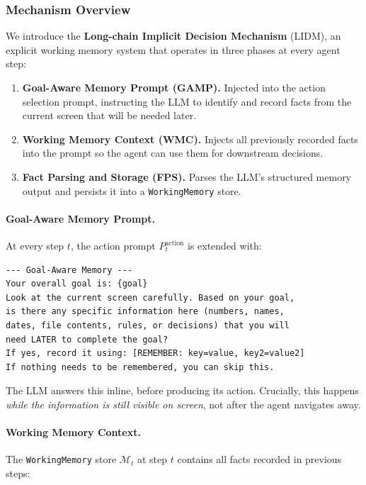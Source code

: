 \subsubsection{Mechanism Overview}

We introduce the \textbf{Long-chain Implicit Decision Mechanism} (LIDM),
an explicit working memory system that operates in three phases at every
agent step:

\begin{enumerate}[leftmargin=*,noitemsep,topsep=2pt]
    \item \textbf{Goal-Aware Memory Prompt (GAMP).} Injected into the action
    selection prompt, instructing the LLM to identify and record facts from the
    current screen that will be needed later.
    \item \textbf{Working Memory Context (WMC).} Injects all previously recorded
    facts into the prompt so the agent can use them for downstream decisions.
    \item \textbf{Fact Parsing and Storage (FPS).} Parses the LLM's structured
    memory output and persists it into a \texttt{WorkingMemory} store.
\end{enumerate}

\paragraph{Goal-Aware Memory Prompt.}
At every step $t$, the action prompt $P_t^{\text{action}}$ is extended with:

\begin{lstlisting}[basicstyle=\small\ttfamily, breaklines=true,
                   frame=single, xleftmargin=10pt]
--- Goal-Aware Memory ---
Your overall goal is: {goal}
Look at the current screen carefully. Based on your goal,
is there any specific information here (numbers, names,
dates, file contents, rules, or decisions) that you will
need LATER to complete the goal?
If yes, record it using: [REMEMBER: key=value, key2=value2]
If nothing needs to be remembered, you can skip this.
\end{lstlisting}

The LLM answers this inline, before producing its action. Crucially, this
happens \textit{while the information is still visible on screen}, not
after the agent navigates away.

\paragraph{Working Memory Context.}
The \texttt{WorkingMemory} store $\mathcal{M}_t$ at step $t$ contains all
facts recorded in previous steps:

